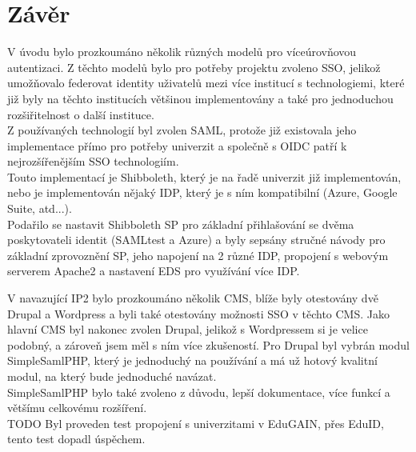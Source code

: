         


\chapter{Závěr}


V úvodu bylo prozkoumáno několik různých modelů pro víceúrovňovou autentizaci. Z těchto modelů bylo pro potřeby projektu zvoleno SSO, jelikož umožňovalo federovat identity uživatelů mezi více institucí s technologiemi, které již byly na těchto institucích většinou implementovány a také pro jednoduchou rozšiřitelnost o další instituce.
\\
Z používaných technologií byl zvolen SAML, protože již existovala jeho implementace přímo pro potřeby univerzit a společně s OIDC patří k nejrozšířenějším SSO technologiím. \\
Touto implementací je Shibboleth, který je na řadě univerzit již implementován, nebo je implementován nějaký IDP, který je s ním kompatibilní (Azure, Google Suite, atd...).\\
Podařilo se nastavit Shibboleth SP pro základní přihlašování se dvěma poskytovateli identit (SAMLtest a Azure) a byly sepsány stručné návody pro základní zprovoznění SP, jeho napojení na 2 různé IDP, propojení s webovým serverem Apache2 a nastavení EDS pro využívání více IDP.

V navazující IP2 bylo prozkoumáno několik CMS, blíže byly otestovány dvě Drupal a Wordpress a byli také otestovány možnosti SSO v těchto CMS. 
Jako hlavní CMS byl nakonec zvolen Drupal, jelikož s Wordpressem si je velice podobný, a zároveň jsem měl s ním více zkušeností. Pro Drupal byl vybrán modul SimpleSamlPHP, který je jednoduchý na používání a má už hotový kvalitní modul, na který bude jednoduché navázat. \\
SimpleSamlPHP bylo také zvoleno z důvodu, lepší dokumentace, více funkcí a většímu celkovému rozšíření.
\\
TODO Byl proveden test propojení s univerzitami v EduGAIN, přes EduID, tento test dopadl úspěchem. 


\label{zaver}






